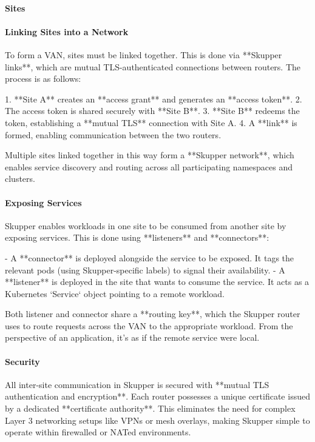 \paragraph{Sites}

\paragraph{Linking Sites into a Network}
To form a VAN, sites must be linked together. This is done via **Skupper links**, which are mutual TLS-authenticated connections between routers. The process is as follows:

1. **Site A** creates an **access grant** and generates an **access token**.
2. The access token is shared securely with **Site B**.
3. **Site B** redeems the token, establishing a **mutual TLS** connection with Site A.
4. A **link** is formed, enabling communication between the two routers.

Multiple sites linked together in this way form a **Skupper network**, which enables service discovery and routing across all participating namespaces and clusters.

\paragraph{Exposing Services}
Skupper enables workloads in one site to be consumed from another site by exposing services. This is done using **listeners** and **connectors**:

- A **connector** is deployed alongside the service to be exposed. It tags the relevant pods (using Skupper-specific labels) to signal their availability.
- A **listener** is deployed in the site that wants to consume the service. It acts as a Kubernetes `Service` object pointing to a remote workload.

Both listener and connector share a **routing key**, which the Skupper router uses to route requests across the VAN to the appropriate workload. From the perspective of an application, it’s as if the remote service were local.

\paragraph{Security}
All inter-site communication in Skupper is secured with **mutual TLS authentication and encryption**. Each router possesses a unique certificate issued by a dedicated **certificate authority**. This eliminates the need for complex Layer 3 networking setups like VPNs or mesh overlays, making Skupper simple to operate within firewalled or NATed environments.

